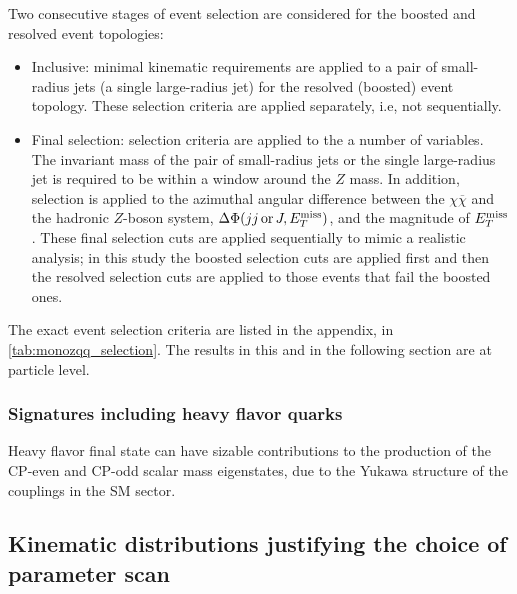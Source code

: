 Two consecutive stages of event selection are considered for the boosted and resolved event topologies:
\begin{itemize}
\item Inclusive: minimal kinematic requirements are applied to a pair of small-radius jets (a single large-radius jet) for the resolved (boosted) event topology. 
These selection criteria are applied separately, i.e, not sequentially.
\item Final selection: selection criteria are applied to the a number of variables. 
The invariant mass of the pair of small-radius jets or the single large-radius jet is required to be within a window around the $Z$ mass. 
In addition, selection is applied to the azimuthal angular difference between the $\chi\overline{\chi}$ and the hadronic $Z$-boson system, $\Delta\Phi(jj {\,\text{or}\,} J, E_T^\mathrm{miss})$, and the magnitude of $E_T^\mathrm{miss}$.
These final selection cuts are applied sequentially to mimic a realistic analysis; in this study the boosted selection cuts are applied first and then the resolved selection cuts are applied to those events that fail the boosted ones.
\end{itemize}

The exact event selection criteria are listed in the appendix, in \autoref{tab:monozqq_selection}. The results in this and in the following section are at particle level. 

\subsubsection{Signatures including heavy flavor quarks}

Heavy flavor final state can have sizable contributions to the production of the CP-even and CP-odd scalar mass eigenstates, due to the Yukawa structure of the couplings in the SM sector. 

\subsection{Kinematic distributions justifying the choice of parameter scan}


